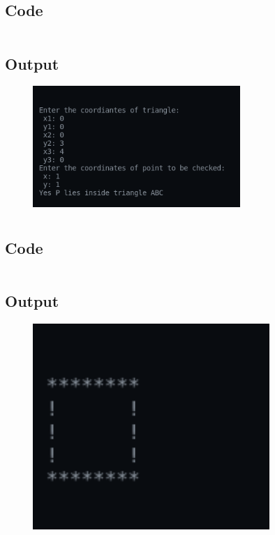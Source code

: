 \documentclass[12pt]{article}
\begin{document}
\subsection{Code}
\inputminted{c}{q9.c}
\subsection{Output}
\begin{figure}[h]
    \centering
    \includegraphics[width=0.7\textwidth]{9.png}
\end{figure}

\newpage
\section{}
\subsection{Code}
\inputminted{c}{q10.c}
\subsection{Output}
\begin{figure}[h]
    \centering
    \includegraphics[width=0.8\textwidth]{10.png}
\end{figure}
\end{document}

